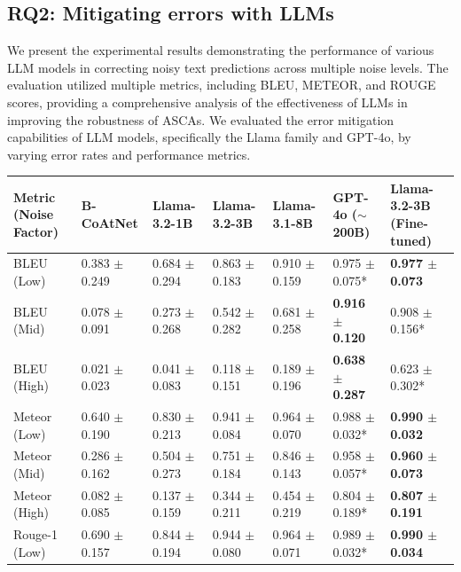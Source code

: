 \subsection{RQ2: Mitigating errors with LLMs}
We present the experimental results demonstrating the performance of various LLM models in correcting noisy text predictions across multiple noise levels. 
The evaluation utilized multiple metrics, including BLEU, METEOR, and ROUGE scores, providing a comprehensive analysis of the effectiveness of LLMs in improving the robustness of ASCAs. 
We evaluated the error mitigation capabilities of LLM models, specifically the Llama family and GPT-4o, by varying error rates and performance metrics. 
\par 
\begin{table}[htbp]
    \centering
    \small
    \begin{tabular}{l|p{2cm}p{2cm}p{2cm}p{2cm}p{2cm}p{2cm}}
        \toprule
        \textbf{Metric (Noise Factor)} & \textbf{B-CoAtNet} & \textbf{Llama-3.2-1B} & \textbf{Llama-3.2-3B} & \textbf{Llama-3.1-8B} & \textbf{GPT-4o ($\sim$200B)} &\textbf{Llama-3.2-3B (Fine-tuned)} \\ \midrule
        BLEU (Low) & 0.383 $\pm$ 0.249 & 0.684 $\pm$ 0.294 & 0.863 $\pm$ 0.183 & 0.910 $\pm$ 0.159 & 0.975 $\pm$ 0.075* & \textbf{0.977 $\pm$ 0.073} \\
        BLEU (Mid) & 0.078 $\pm$ 0.091 & 0.273 $\pm$ 0.268 & 0.542 $\pm$ 0.282 & 0.681 $\pm$ 0.258 & \textbf{0.916 $\pm$ 0.120} & 0.908 $\pm$ 0.156* \\
        BLEU (High) & 0.021 $\pm$ 0.023 & 0.041 $\pm$ 0.083 & 0.118 $\pm$ 0.151 & 0.189 $\pm$ 0.196 & \textbf{0.638 $\pm$ 0.287} & 0.623 $\pm$ 0.302* \\
        \midrule
        Meteor (Low) & 0.640 $\pm$ 0.190 & 0.830 $\pm$ 0.213 & 0.941 $\pm$ 0.084 & 0.964 $\pm$ 0.070 & 0.988 $\pm$ 0.032* & \textbf{0.990 $\pm$ 0.032} \\
        Meteor (Mid) & 0.286 $\pm$ 0.162 & 0.504 $\pm$ 0.273 & 0.751 $\pm$ 0.184 & 0.846 $\pm$ 0.143 & 0.958 $\pm$ 0.057* & \textbf{0.960 $\pm$ 0.073} \\
        Meteor (High) & 0.082 $\pm$ 0.085 & 0.137 $\pm$ 0.159 & 0.344 $\pm$ 0.211 & 0.454 $\pm$ 0.219 & 0.804 $\pm$ 0.189* & \textbf{0.807 $\pm$ 0.191} \\
        \midrule
        Rouge-1 (Low) & 0.690 $\pm$ 0.157 & 0.844 $\pm$ 0.194 & 0.944 $\pm$ 0.080 & 0.964 $\pm$ 0.071 & 0.989 $\pm$ 0.032* & \textbf{0.990 $\pm$ 0.034} \\

\end{tabular}
\end{table}
